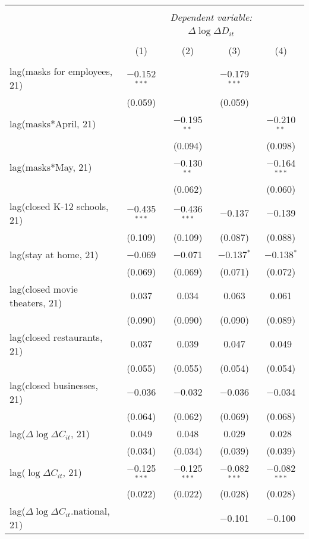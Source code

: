 \begin{tabular}{@{\extracolsep{1pt}}lcccc} 
\\[-1.8ex]\hline 
\hline \\[-1.8ex] 
 & \multicolumn{4}{c}{\textit{Dependent variable:}} \\ 
\cline{2-5} 
 & \multicolumn{4}{c}{$\Delta \log \Delta D_{it}$} \\ 
\\[-1.8ex] & (1) & (2) & (3) & (4)\\ 
\hline \\[-1.8ex] 
 lag(masks for employees, 21) & $-$0.152$^{***}$ &  & $-$0.179$^{***}$ &  \\ 
  & (0.059) &  & (0.059) &  \\ 
  lag(masks*April, 21) &  & $-$0.195$^{**}$ &  & $-$0.210$^{**}$ \\ 
  &  & (0.094) &  & (0.098) \\ 
  lag(masks*May, 21) &  & $-$0.130$^{**}$ &  & $-$0.164$^{***}$ \\ 
  &  & (0.062) &  & (0.060) \\ 
  lag(closed K-12 schools, 21) & $-$0.435$^{***}$ & $-$0.436$^{***}$ & $-$0.137 & $-$0.139 \\ 
  & (0.109) & (0.109) & (0.087) & (0.088) \\ 
  lag(stay at home, 21) & $-$0.069 & $-$0.071 & $-$0.137$^{*}$ & $-$0.138$^{*}$ \\ 
  & (0.069) & (0.069) & (0.071) & (0.072) \\ 
  lag(closed movie theaters, 21) & 0.037 & 0.034 & 0.063 & 0.061 \\ 
  & (0.090) & (0.090) & (0.090) & (0.089) \\ 
  lag(closed restaurants, 21) & 0.037 & 0.039 & 0.047 & 0.049 \\ 
  & (0.055) & (0.055) & (0.054) & (0.054) \\ 
  lag(closed businesses, 21) & $-$0.036 & $-$0.032 & $-$0.036 & $-$0.034 \\ 
  & (0.064) & (0.062) & (0.069) & (0.068) \\ 
  lag($\Delta \log \Delta C_{it}$, 21) & 0.049 & 0.048 & 0.029 & 0.028 \\ 
  & (0.034) & (0.034) & (0.039) & (0.039) \\ 
  lag($\log \Delta C_{it}$, 21) & $-$0.125$^{***}$ & $-$0.125$^{***}$ & $-$0.082$^{***}$ & $-$0.082$^{***}$ \\ 
  & (0.022) & (0.022) & (0.028) & (0.028) \\ 
  lag($\Delta \log \Delta C_{it}$.national, 21) &  &  & $-$0.101 & $-$0.100 \\ 

\end{tabular}
